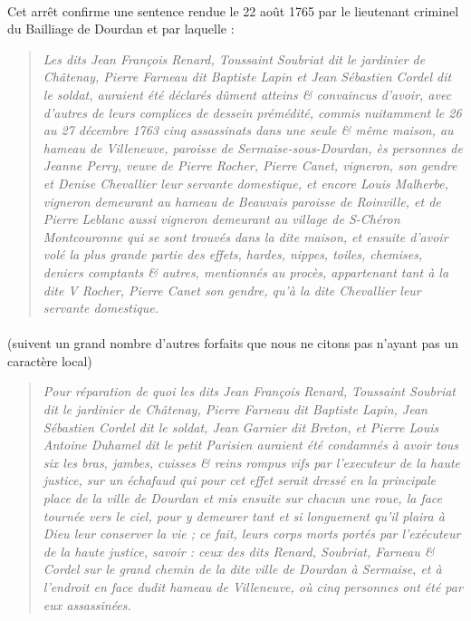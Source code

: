 \documentclass[../eBook.tex]{subfiles}
\begin{document}
      \paragraph{}Cet arrêt confirme une sentence rendue le 22 août 1765 par le lieutenant criminel du Bailliage de Dourdan et par laquelle :
      \begin{quote}
        \og \textit{Les dits Jean François Renard, Toussaint Soubriat dit le jardinier de Châtenay, Pierre Farneau dit Baptiste Lapin et Jean Sébastien Cordel dit le soldat, auraient été déclarés dûment atteins \& convaincus d'avoir, avec d'autres de leurs complices de dessein prémédité, commis nuitamment le 26 au 27 décembre 1763 cinq assassinats dans une seule \& même maison, au hameau de Villeneuve, paroisse de Sermaise-sous-Dourdan, ès personnes de Jeanne Perry, veuve de Pierre Rocher, Pierre Canet, vigneron, son gendre et Denise Chevallier leur servante domestique, et encore Louis Malherbe, vigneron demeurant au hameau de Beauvais paroisse de Roinville, et de Pierre Leblanc aussi vigneron demeurant au village de S-Chéron Montcouronne qui se sont trouvés dans la dite maison, et ensuite d'avoir volé la plus grande partie des effets, hardes, nippes, toiles, chemises, deniers comptants \& autres, mentionnés au procès, appartenant tant à la dite V Rocher, Pierre Canet son gendre, qu'à la dite Chevallier leur servante domestique.} \dotfill \fg{}
      \end{quote}
      \paragraph{}(suivent un grand nombre d'autres forfaits que nous ne citons pas n'ayant pas un caractère local)
      \begin{quote}
        \og \textit{Pour réparation de quoi les dits Jean François Renard, Toussaint Soubriat dit le jardinier de Châtenay, Pierre Farneau dit Baptiste Lapin, Jean Sébastien Cordel dit le soldat, Jean Garnier dit Breton, et Pierre Louis Antoine Duhamel dit le petit Parisien auraient été condamnés à avoir tous  six les bras, jambes, cuisses \& reins rompus vifs par l'executeur de la haute justice, sur un échafaud qui pour cet effet serait dressé en la principale place de la ville de Dourdan et mis ensuite sur chacun une roue, la face tournée vers le ciel, pour y demeurer tant et si longuement qu'il plaira à Dieu leur conserver la vie ; ce fait, leurs corps morts portés par l'exécuteur de la haute justice, savoir : ceux des dits Renard, Soubriat, Farneau \& Cordel sur le grand chemin de la dite ville de Dourdan à Sermaise, et à l'endroit en face dudit hameau de Villeneuve, où cinq personnes ont été par eux assassinées.} \fg{}
      \end{quote}
\end{document}
